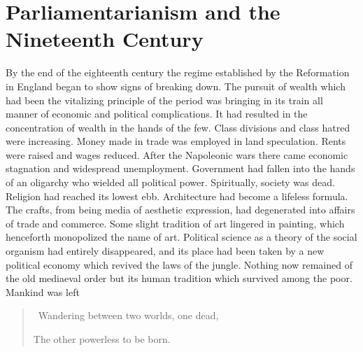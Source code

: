 \documentclass{book}
\begin{document}
\chapter{Parliamentarianism and the Nineteenth Century}
\label{chapter-17}
By the end of the eighteenth century the regime established by the Reformation in England began to show signs of breaking down. The pursuit of wealth which had been the vitalizing principle of the period was bringing in its train all manner of economic and political complications. It had resulted in the concentration of wealth in the hands of the few. Class divisions and class hatred were increasing. Money made in trade was employed in land speculation. Rents were raised and wages reduced. After the Napoleonic wars there came economic stagnation and widespread unemployment. Government had fallen into the hands of an oligarchy who wielded all political power. Spiritually, society was dead. Religion had reached its lowest ebb. Architecture had become a lifeless formula. The crafts, from being media of aesthetic expression, had degenerated into affairs of trade and commerce. Some slight tradition of art lingered in painting, which henceforth monopolized the name of art. Political science as a theory of the social organism had entirely disappeared, and its place had been taken by a new political economy which revived the laws of the jungle. Nothing now remained of the old mediaeval order but its human tradition which survived among the poor. Mankind was left

\begin{quotation}\
	Wandering between two worlds, one dead,

	The other powerless to be born.
\end{quotation}
\end{document}
